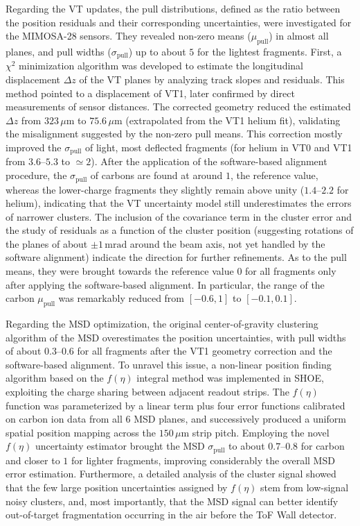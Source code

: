 Regarding the VT updates, the pull distributions, defined as the ratio between the position residuals and their corresponding uncertainties, were investigated for the MIMOSA-28 sensors. They revealed non-zero means ($\mu_\text{pull}$) in almost all planes, and pull widths ($\sigma_\text{pull}$) up to about $5$ for the lightest fragments. First, a $\chi^2$ minimization algorithm was developed to estimate the longitudinal displacement $\Delta z$ of the VT planes by analyzing track slopes and residuals. This method pointed to a displacement of VT1, later confirmed by direct measurements of sensor distances. The corrected geometry reduced the estimated $\Delta z$ from $323\,\mu\mathrm{m}$ to $75.6\,\mu\mathrm{m}$ (extrapolated from the VT1 helium fit), validating the misalignment suggested by the non-zero pull means. This correction mostly improved the $\sigma_\text{pull}$ of light, most deflected fragments (for helium in VT0 and VT1 from $3.6$--$5.3$ to $\simeq2$). After the application of the software-based alignment procedure, the $\sigma_\text{pull}$ of carbons are found at around $1$, the reference value, whereas the lower-charge fragments they slightly remain above unity ($1.4$--$2.2$ for helium), indicating that the VT uncertainty model still underestimates the errors of narrower clusters. The inclusion of the covariance term in the cluster error and the study of residuals as a function of the cluster position (suggesting rotations of the planes of about $\pm1\,\mathrm{mrad}$ around the beam axis, not yet handled by the software alignment) indicate the direction for further refinements. As to the pull means, they were brought towards the reference value $0$ for all fragments only after applying the software-based alignment. In particular, the range of the carbon $\mu_{\text{pull}}$ was remarkably reduced from $[-0.6,1]$ to $[-0.1,0.1]$.

Regarding the MSD optimization, the original center-of-gravity clustering algorithm of the MSD overestimates the position uncertainties, with pull widths of about $0.3$--$0.6$ for all fragments after the VT1 geometry correction and the software-based alignment. To unravel this issue, a non-linear position finding algorithm based on the $f(\eta)$ integral method was implemented in SHOE, exploiting the charge sharing between adjacent readout strips. The $f(\eta)$ function was parameterized by a linear term plus four error functions calibrated on carbon ion data from all $6$ MSD planes, and successively produced a uniform spatial position mapping across the $150\,\mu\text{m}$ strip pitch. Employing the novel $f(\eta)$ uncertainty estimator brought the MSD $\sigma_{\text{pull}}$ to about $0.7$--$0.8$ for carbon and closer to $1$ for lighter fragments, improving considerably the overall MSD error estimation. Furthermore, a detailed analysis of the cluster signal showed that the few large position uncertainties assigned by $f(\eta)$ stem from low-signal noisy clusters, and, most importantly, that the MSD signal can better identify out-of-target fragmentation occurring in the air before the ToF Wall detector.


